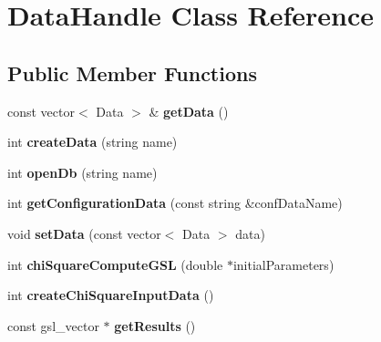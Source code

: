 \hypertarget{classDataHandle}{\section{Data\-Handle Class Reference}
\label{classDataHandle}
}
\subsection*{Public Member Functions}
\begin{DoxyCompactItemize}
\item 
\hypertarget{classDataHandle_a0c73485b27cb84a81e8ce8687cadb0be}{const vector$<$ Data $>$ \& {\bfseries get\-Data} ()}\label{classDataHandle_a0c73485b27cb84a81e8ce8687cadb0be}

\item 
\hypertarget{classDataHandle_a668f1526556610e699c2665a9dd88c2d}{int {\bfseries create\-Data} (string name)}\label{classDataHandle_a668f1526556610e699c2665a9dd88c2d}

\item 
\hypertarget{classDataHandle_ac8656eccbd5bc3b9819e272e1ff85e70}{int {\bfseries open\-Db} (string name)}\label{classDataHandle_ac8656eccbd5bc3b9819e272e1ff85e70}

\item 
\hypertarget{classDataHandle_a6fa18d21b416a4a878734fdf80a51161}{int {\bfseries get\-Configuration\-Data} (const string \&conf\-Data\-Name)}\label{classDataHandle_a6fa18d21b416a4a878734fdf80a51161}

\item 
\hypertarget{classDataHandle_ac6ff603576fc66ad42fa713109e046ae}{void {\bfseries set\-Data} (const vector$<$ Data $>$ data)}\label{classDataHandle_ac6ff603576fc66ad42fa713109e046ae}

\item 
\hypertarget{classDataHandle_ab6355e1e77c6f124e602c36388238a69}{int {\bfseries chi\-Square\-Compute\-G\-S\-L} (double $\ast$initial\-Parameters)}\label{classDataHandle_ab6355e1e77c6f124e602c36388238a69}

\item 
\hypertarget{classDataHandle_a9b4e75dae66933abb398b618f2f7dc19}{int {\bfseries create\-Chi\-Square\-Input\-Data} ()}\label{classDataHandle_a9b4e75dae66933abb398b618f2f7dc19}

\item 
\hypertarget{classDataHandle_aca0c6a382154db5b6a0478e7a7b11b9d}{const gsl\-\_\-vector $\ast$ {\bfseries get\-Results} ()}\label{classDataHandle_aca0c6a382154db5b6a0478e7a7b11b9d}


\end{DoxyCompactItemize}
